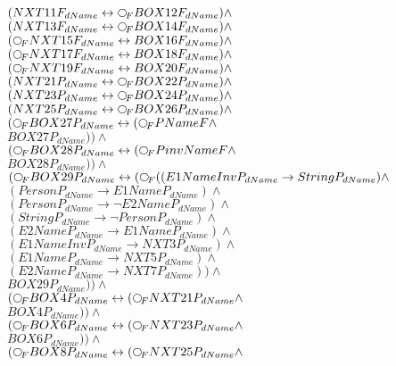 \documentclass[a4paper,10pt]{article}
\begin{document}
 $ (NXT11F_{dName} \leftrightarrow  \Rnext BOX12F_{dName}) \land $ \\ 
 $ (NXT13F_{dName} \leftrightarrow  \Rnext BOX14F_{dName}) \land $ \\ 
 $ ( \Rnext NXT15F_{dName} \leftrightarrow BOX16F_{dName}) \land $ \\ 
 $ ( \Rnext NXT17F_{dName} \leftrightarrow BOX18F_{dName}) \land $ \\ 
 $ ( \Rnext NXT19F_{dName} \leftrightarrow BOX20F_{dName}) \land $ \\ 
 $ (NXT21P_{dName} \leftrightarrow  \Rnext BOX22P_{dName}) \land $ \\ 
 $ (NXT23P_{dName} \leftrightarrow  \Rnext BOX24P_{dName}) \land $ \\ 
 $ (NXT25P_{dName} \leftrightarrow  \Rnext BOX26P_{dName}) \land $ \\ 
 $ ( \Rnext BOX27P_{dName} \leftrightarrow ( \Rnext PNameF \land $ \\ 
 $ BOX27P_{dName})) \land $ \\ 
 $ ( \Rnext BOX28P_{dName} \leftrightarrow ( \Rnext PinvNameF \land $ \\ 
 $ BOX28P_{dName})) \land $ \\ 
 $ ( \Rnext BOX29P_{dName} \leftrightarrow ( \Rnext ((E1NameInvP_{dName} \rightarrow StringP_{dName}) \land $ \\ 
 $ (PersonP_{dName} \rightarrow E1NameP_{dName}) \land $ \\ 
 $ (PersonP_{dName} \rightarrow  \lnot E2NameP_{dName}) \land $ \\ 
 $ (StringP_{dName} \rightarrow  \lnot PersonP_{dName}) \land $ \\ 
 $ (E2NameP_{dName} \rightarrow E1NameP_{dName}) \land $ \\ 
 $ (E1NameInvP_{dName} \rightarrow NXT3P_{dName}) \land $ \\ 
 $ (E1NameP_{dName} \rightarrow NXT5P_{dName}) \land $ \\ 
 $ (E2NameP_{dName} \rightarrow NXT7P_{dName})) \land $ \\ 
 $ BOX29P_{dName})) \land $ \\ 
 $ ( \Rnext BOX4P_{dName} \leftrightarrow ( \Rnext NXT21P_{dName} \land $ \\ 
 $ BOX4P_{dName})) \land $ \\ 
 $ ( \Rnext BOX6P_{dName} \leftrightarrow ( \Rnext NXT23P_{dName} \land $ \\ 
 $ BOX6P_{dName})) \land $ \\ 
 $ ( \Rnext BOX8P_{dName} \leftrightarrow ( \Rnext NXT25P_{dName} \land $ \\ 
\end{document}
